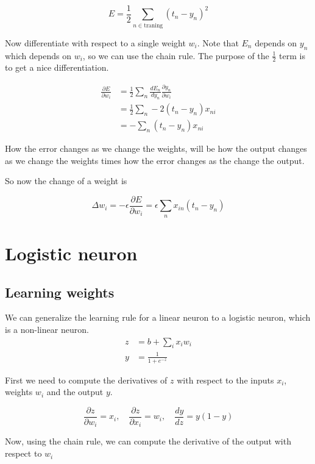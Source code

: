 \documentclass[a4paper]{article}
\begin{document}
\[
    E=\frac{1}{2} \sum_{n\in \text{traning}} {(t_n - y_n)}^2
\]

Now differentiate with respect to a single weight \(w_i\).
Note that \(E_n\) depends on \(y_n\) which depends on \(w_i\), so we can use the chain rule.
The purpose of the \(\frac{1}{2}\) term is to get a nice differentiation.

\begin{align*}
    \frac{\partial E}{\partial w_i}&=
    \frac{1}{2} \sum_n \frac{dE_n}{dy_n} \frac{\partial y_n}{\partial w_i} \\
    &= \frac{1}{2} \sum_n -2(t_n-y_n) x_{ni} \\
    &= - \sum_n (t_n-y_n) x_{ni}
\end{align*}

How the error changes as we change the weights, will be how the output changes as we change the weights
times how the error changes as the change the output.

So now the change of a weight is

\[
    \Delta w_i=-\epsilon \frac{\partial E}{\partial w_i} = \epsilon \sum_n x_{in}(t_n-y_n)
\]



\pagebreak

\section{Logistic neuron}

\subsection{Learning weights}

We can generalize the learning rule for a linear neuron to a logistic neuron, which is a non-linear neuron.
\\
\begin{align*}    
    z&=b+\sum_{i} x_i w_i \\
    y&=\frac{1}{1+e^{-z}}
\end{align*}

First we need to compute the derivatives of \(z\) with respect to the inputs \(x_i\), weights \(w_i\) and the output \(y\).

\[
    \frac{\partial z}{\partial w_i} = x_i,
    \quad
    \frac{\partial z}{\partial x_i} = w_i,
    \quad
    \frac{dy}{dz}=y(1-y)
\]

Now, using the chain rule, we can compute the derivative of the output with respect to \(w_i\)
\end{document}
